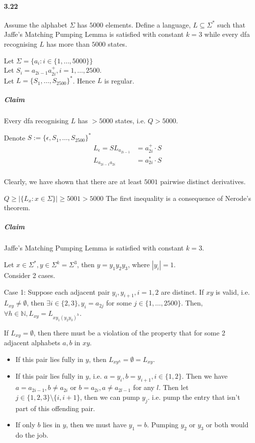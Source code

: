 \documentclass{article}
\begin{document}
\paragraph{3.22}\mbox{}

Assume the alphabet $\Sigma$ has $5000$ elements. Define a language, $L\subseteq \Sigma^*$ such that Jaffe's Matching Pumping Lemma is satisfied with constant $
k=3$ while every dfa recognising $L$ has more than $5000$ states.

Let $\Sigma = \{a_i:i\in \{1, \dots, 5000\}\}$\\
Let $S_i=a_{2i-1}a_{2i}^+,i=1,\dots,2500$.\\
Let $L=\{S_1,\dots, S_{2500}\}^*$. Hence $L$ is regular.

\subparagraph{Claim} Every dfa recognising $L$ has $>5000$ states, i.e. $Q>5000$.

Denote $S:=\{\epsilon, S_1, \dots, S_{2500}\}^*$
\begin{align*}
	L_\epsilon = S
	L_{a_{2i-1}} &= a_{2i}^+\cdot S\\
	L_{a_{2i-1}a_{2i}} &= a_{2i}^*\cdot S\\
\end{align*}

Clearly, we have shown that there are at least $5001$ pairwise distinct derivatives.

$Q\geq |\{L_x: x\in \Sigma\}| \geq 5001>5000$
The first inequality is a consequence of Nerode's theorem.

\subparagraph{Claim} Jaffe's Matching Pumping Lemma is satisfied with constant $k=3$.

Let $x\in \Sigma^*, y\in \Sigma^k=\Sigma^3$, then $y=y_1y_2y_3$, where $|y_i|=1$.\\
Consider 2 cases.

Case 1: Suppose each adjacent pair $y_i,y_{i+1}, i=1,2$ are distinct.
If $xy$ is valid, i.e. $L_{xy}\neq \emptyset$, then $\exists i\in \{2,3\}, y_i=a_{2j}$ for some $j\in \{1, \dots, 2500\}$. Then, $\forall h\in \mathbb{N}, L_{xy}=L_{xy_1(y_2y_3)^h}$.

If $L_{xy}=\emptyset$, then there must be a violation of the property that for some 2 adjacent alphabets $a,b$ in $xy$. 
\begin{itemize}
	\item If this pair lies fully in $y$, then $L_{xy^h}=\emptyset=L_{xy}$.
	\item If this pair lies fully in $y$, i.e. $a=y_i, b=y_{i+1}, i\in \{1,2\}$. Then we have $a=a_{2i-1}, b\neq a_{2i}$ or $b=a_{2i}, a\neq a_{2l-1}$ for any $l$. Then let $j\in \{1,2,3\}\setminus \{i, i+1\}$, then we can pump $y_j$. i.e. pump the entry that isn't part of this offending pair.
	\item If only $b$ lies in $y$, then we must have $y_1=b$. Pumping $y_2$ or $y_3$ or both would do the job.
\end{itemize}
\end{document}
